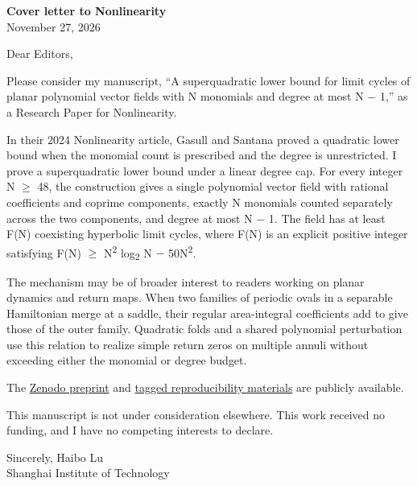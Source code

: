 \documentclass[11pt]{article}
\begin{document}
\textbf{Cover letter to Nonlinearity}\\
November 27, 2026

Dear Editors,

Please consider my manuscript, ``A superquadratic lower bound for limit cycles of planar polynomial vector fields with N monomials and degree at most N $-$ 1,'' as a Research Paper for Nonlinearity.

In their 2024 Nonlinearity article, Gasull and Santana proved a quadratic lower bound when the monomial count is prescribed and the degree is unrestricted. I prove a superquadratic lower bound under a linear degree cap. For every integer N $\geq$ 48, the construction gives a single polynomial vector field with rational coefficients and coprime components, exactly N monomials counted separately across the two components, and degree at most N $-$ 1. The field has at least F(N) coexisting hyperbolic limit cycles, where F(N) is an explicit positive integer satisfying F(N) $\geq$ N\textsuperscript{2} log\textsubscript{2} N $-$ 50N\textsuperscript{2}.

The mechanism may be of broader interest to readers working on planar dynamics and return maps. When two families of periodic ovals in a separable Hamiltonian merge at a saddle, their regular area-integral coefficients add to give those of the outer family. Quadratic folds and a shared polynomial perturbation use this relation to realize simple return zeros on multiple annuli without exceeding either the monomial or degree budget.

The \href{https://doi.org/10.5281/zenodo.24575586}{Zenodo preprint} and \href{https://github.com/h-lu/fewnomial-limit-cycles-public/tree/v1.0.1}{tagged reproducibility materials} are publicly available.

This manuscript is not under consideration elsewhere. This work received no funding, and I have no competing interests to declare.

Sincerely,  
Haibo Lu\\
Shanghai Institute of Technology
\end{document}
